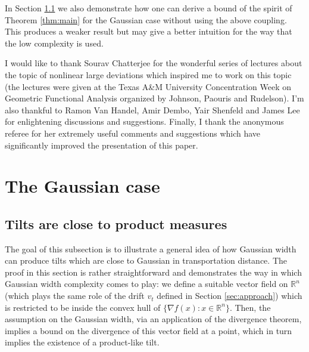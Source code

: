 \documentclass[12pt]{article}
\def \RR {\mathbb R}
\theoremstyle{definition}
\theoremstyle{remark}
\begin{document}
In Section \ref{sec:idea} we also demonstrate how one can derive a bound of the spirit of Theorem \ref{thm:main} for the Gaussian case without using the above coupling. This produces a weaker result but may give a better intuition for the way that the low complexity is used.

 I would like to thank Sourav Chatterjee for the wonderful series of lectures about the topic of nonlinear large deviations which inspired me to work on this topic (the lectures were given at the Texas A\&M University Concentration Week on Geometric Functional Analysis organized by Johnson, Paouris and Rudelson). I'm also thankful to Ramon Van Handel, Amir Dembo, Yair Shenfeld and James Lee for enlightening discussions and suggestions. Finally, I thank the anonymous referee for her extremely useful comments and suggestions which have significantly improved the presentation of this paper.

\section{The Gaussian case}

\subsection{Tilts are close to product measures} \label{sec:idea}
The goal of this subsection is to illustrate a general idea of how Gaussian width can produce tilts which are close to Gaussian in transportation distance. The proof in this section is rather straightforward and demonstrates the way in which Gaussian width complexity comes to play: we define a suitable vector field on $\RR^n$ (which plays the same role of the drift $v_t$ defined in Section \ref{sec:approach}) which is restricted to be inside the convex hull of $\{\nabla f(x): x \in \RR^n\}$. Then, the assumption on the Gaussian width, via an application of the divergence theorem, implies a bound on the divergence of this vector field at a point, which in turn implies the existence of a product-like tilt. \\
\end{document}
